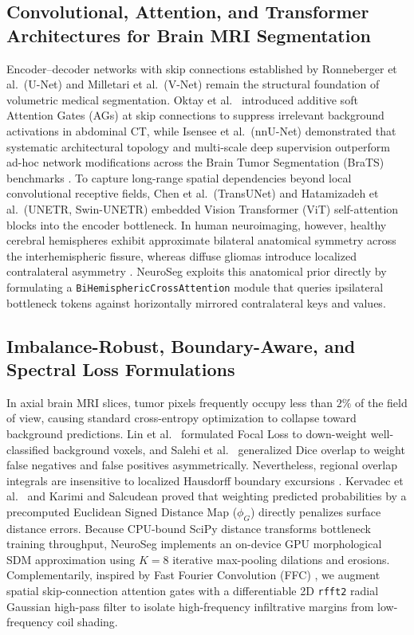 \documentclass[journal,onecolumn,10pt]{IEEEtran}
\begin{document}
\subsection{Convolutional, Attention, and Transformer Architectures for Brain MRI Segmentation}
Encoder--decoder networks with skip connections established by Ronneberger et al.\ (U-Net) \cite{ronneberger2015unet} and Milletari et al.\ (V-Net) \cite{milletari2016vnet} remain the structural foundation of volumetric medical segmentation. Oktay et al.\ \cite{oktay2018attention} introduced additive soft Attention Gates (AGs) at skip connections to suppress irrelevant background activations in abdominal CT, while Isensee et al.\ (nnU-Net) \cite{isensee2021nnunet} demonstrated that systematic architectural topology and multi-scale deep supervision outperform ad-hoc network modifications across the Brain Tumor Segmentation (BraTS) benchmarks \cite{menze2015brats, bakas2017advancing}. To capture long-range spatial dependencies beyond local convolutional receptive fields, Chen et al.\ (TransUNet) \cite{chen2021transunet} and Hatamizadeh et al.\ (UNETR, Swin-UNETR) \cite{hatamizadeh2022unetr, hatamizadeh2021swinunetr} embedded Vision Transformer (ViT) self-attention blocks \cite{dosovitskiy2021vit, vaswani2017attention} into the encoder bottleneck. In human neuroimaging, however, healthy cerebral hemispheres exhibit approximate bilateral anatomical symmetry across the interhemispheric fissure, whereas diffuse gliomas introduce localized contralateral asymmetry \cite{buda2019association, zhou2018unetplusplus}. NeuroSeg exploits this anatomical prior directly by formulating a \texttt{BiHemisphericCrossAttention} module that queries ipsilateral bottleneck tokens against horizontally mirrored contralateral keys and values.

\subsection{Imbalance-Robust, Boundary-Aware, and Spectral Loss Formulations}
In axial brain MRI slices, tumor pixels frequently occupy less than $2\%$ of the field of view, causing standard cross-entropy optimization to collapse toward background predictions. Lin et al.\ \cite{lin2017focal} formulated Focal Loss to down-weight well-classified background voxels, and Salehi et al.\ \cite{salehi2017tversky} generalized Dice overlap to weight false negatives and false positives asymmetrically. Nevertheless, regional overlap integrals are insensitive to localized Hausdorff boundary excursions \cite{reinke2024metrics}. Kervadec et al.\ \cite{kervadec2021boundary} and Karimi and Salcudean \cite{karimi2020hd} proved that weighting predicted probabilities by a precomputed Euclidean Signed Distance Map ($\phi_G$) directly penalizes surface distance errors. Because CPU-bound SciPy distance transforms bottleneck training throughput, NeuroSeg implements an on-device GPU morphological SDM approximation using $K = 8$ iterative max-pooling dilations and erosions. Complementarily, inspired by Fast Fourier Convolution (FFC) \cite{chi2020ffc}, we augment spatial skip-connection attention gates with a differentiable 2D \texttt{rfft2} radial Gaussian high-pass filter to isolate high-frequency infiltrative margins from low-frequency coil shading.
\end{document}
